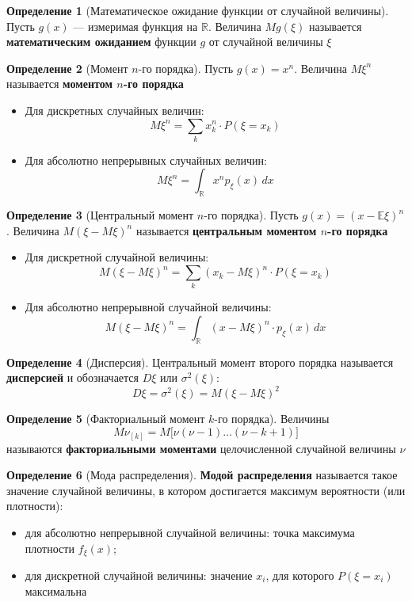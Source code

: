 \documentclass[12pt,a4paper]{article}
\theoremstyle{definition}
\newtheorem{definition}{Определение}[section]
\begin{document}
\begin{definition}[Математическое ожидание функции от случайной величины]
Пусть $g(x)$ --- измеримая функция на $\mathbb{R}$. Величина $Mg(\xi)$ называется \textbf{математическим ожиданием} функции $g$ от случайной величины $\xi$
\end{definition}

\begin{definition}[Момент $n$-го порядка]
Пусть $g(x) = x^n$. Величина $M\xi^n$ называется \textbf{моментом $n$-го порядка}
\begin{itemize}
    \item Для дискретных случайных величин:
    \[
    M\xi^n = \sum_{k} x_k^n \cdot P(\xi = x_k)
    \]
    \item Для абсолютно непрерывных случайных величин:
    \[
    M\xi^n = \int_{\mathbb{R}} x^n p_\xi(x)\,dx
    \]
\end{itemize}
\end{definition}

\begin{definition}[Центральный момент $n$-го порядка]
Пусть $g(x) = (x - \mathbb{E}\xi)^n$. Величина $M(\xi - M\xi)^n$ называется \textbf{центральным моментом $n$-го порядка}
\begin{itemize}
    \item Для дискретной случайной величины:
    \[
    M(\xi - M\xi)^n = \sum_{k} (x_k - M\xi)^n \cdot P(\xi = x_k)
    \]
    \item Для абсолютно непрерывной случайной величины:
    \[
    M(\xi - M\xi)^n = \int_{\mathbb{R}} (x - M\xi)^n \cdot p_\xi(x)\,dx
    \]
\end{itemize}
\end{definition}

\begin{definition}[Дисперсия]
Центральный момент второго порядка называется \textbf{дисперсией} и обозначается $D\xi$ или $\sigma^2(\xi)$:
\[
D\xi = \sigma^2(\xi) = M(\xi - M\xi)^2
\]
\end{definition}

\begin{definition}[Факториальный момент $k$-го порядка]
Величины
\[
M\nu_{[k]} = M\bigl[\nu(\nu-1)\dots(\nu-k+1)\bigr]
\]
называются \textbf{факториальными моментами} целочисленной случайной величины $\nu$
\end{definition}

\begin{definition}[Мода распределения]
\textbf{Модой распределения} называется такое значение случайной величины, в котором достигается максимум вероятности (или плотности):
\begin{itemize}
    \item для абсолютно непрерывной случайной величины: точка максимума плотности $f_\xi(x)$;
    \item для дискретной случайной величины: значение $x_i$, для которого $P(\xi = x_i)$ максимальна
\end{itemize}
\end{definition}
\end{document}
